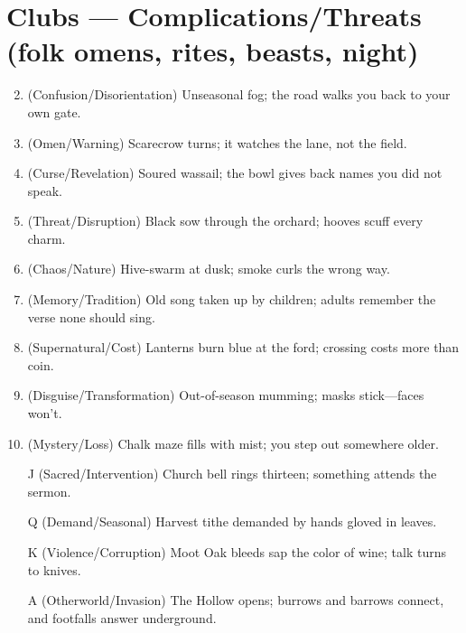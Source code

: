 \section*{Clubs --- Complications/Threats (folk omens, rites, beasts, night)}
\label{sec:aelaerem-complications}
\begin{enumerate}
\setcounter{enumi}{1}
\item (Confusion/Disorientation) Unseasonal fog; the road walks you back to your own gate.
\item (Omen/Warning) Scarecrow turns; it watches the lane, not the field.
\item (Curse/Revelation) Soured wassail; the bowl gives back names you did not speak.
\item (Threat/Disruption) Black sow through the orchard; hooves scuff every charm.
\item (Chaos/Nature) Hive-swarm at dusk; smoke curls the wrong way.
\item (Memory/Tradition) Old song taken up by children; adults remember the verse none should sing.
\item (Supernatural/Cost) Lanterns burn blue at the ford; crossing costs more than coin.
\item (Disguise/Transformation) Out-of-season mumming; masks stick---faces won't.
\item (Mystery/Loss) Chalk maze fills with mist; you step out somewhere older.
\item[J] (Sacred/Intervention) Church bell rings thirteen; something attends the sermon.
\item[Q] (Demand/Seasonal) Harvest tithe demanded by hands gloved in leaves.
\item[K] (Violence/Corruption) Moot Oak bleeds sap the color of wine; talk turns to knives.
\item[A] (Otherworld/Invasion) The Hollow opens; burrows and barrows connect, and footfalls answer underground.
\end{enumerate}

